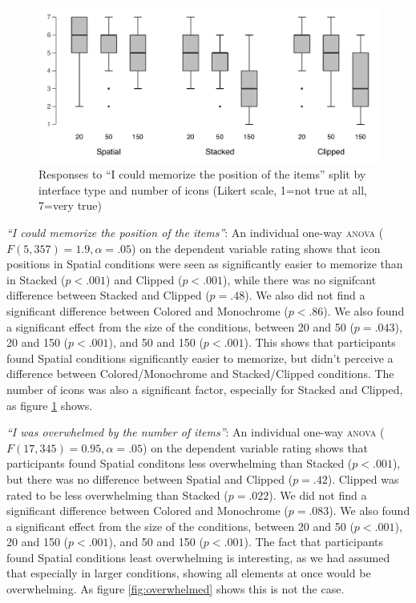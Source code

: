 \documentclass[nobib]{tufte-book} %
\begin{document}
\begin{figure}
  \includegraphics{postcon-memorize.pdf}
  \caption{Responses to ``I could memorize the position of the items'' split by interface type and number of icons (Likert scale, 1=not true at all, 7=very true)}
  \label{fig:memorize}
\end{figure}

\emph{``I could memorize the position of the items''}:
An individual one-way \textsc{anova} ($F(5,357) = 1.9, \alpha = .05$) on the dependent variable rating shows that icon positions in Spatial conditions were seen as significantly easier to memorize than in Stacked ($p < .001$) and Clipped ($p < .001$), while there was no signifcant difference between Stacked and Clipped ($p = .48$). We also did not find a significant difference between Colored and Monochrome ($p < .86$). We also found a significant effect from the size of the conditions, between 20 and 50 ($p = .043$), 20 and 150 ($p < .001$), and 50 and 150 ($p < .001$). This shows that participants found Spatial conditions significantly easier to memorize, but didn't perceive a difference between Colored/Monochrome and Stacked/Clipped conditions. The number of icons was also a significant factor, especially for Stacked and Clipped, as figure \ref{fig:memorize} shows.

\emph{``I was overwhelmed by the number of items''}:
An individual one-way \textsc{anova} ($F(17,345) = 0.95, \alpha = .05$) on the dependent variable rating shows that participants found Spatial conditons less overwhelming than Stacked ($p < .001$), but there was no difference between Spatial and Clipped ($p = .42$). Clipped was rated to be less overwhelming than Stacked ($p = .022$). We did not find a significant difference between Colored and Monochrome ($p = .083$). We also found a significant effect from the size of the conditions, between 20 and 50 ($p < .001$), 20 and 150 ($p < .001$), and 50 and 150 ($p < .001$). The fact that participants found Spatial conditions least overwhelming is interesting, as we had assumed that especially in larger conditions, showing all elements at once would be overwhelming. As figure \ref{fig:overwhelmed} shows this is not the case.
\end{document}
